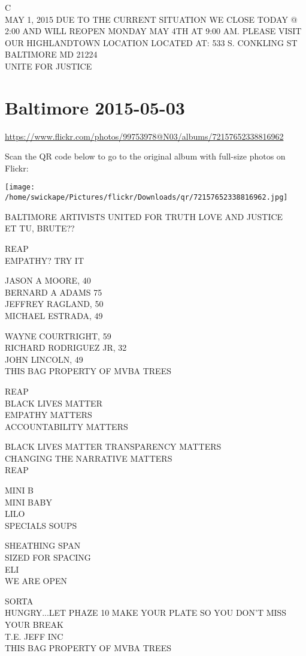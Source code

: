 \documentclass[10pt,letterpaper]{article}
\begin{document}
C\\
MAY 1, 2015  DUE TO THE CURRENT SITUATION WE CLOSE TODAY @ 2:00 AND WILL REOPEN MONDAY MAY 4TH AT 9:00 AM.  PLEASE VISIT OUR HIGHLANDTOWN LOCATION LOCATED AT: 533 S. CONKLING ST BALTIMORE MD 21224\\
UNITE FOR JUSTICE


\section*{Baltimore 2015-05-03}

\url{https://www.flickr.com/photos/99753978@N03/albums/72157652338816962}

Scan the QR code below to go to the original album with full-size photos on Flickr:

\texttt{[image: /home/swickape/Pictures/flickr/Downloads/qr/72157652338816962.jpg]}


BALTIMORE ARTIVISTS UNITED FOR TRUTH LOVE AND JUSTICE\\
ET TU, BRUTE??

REAP\\
EMPATHY?  TRY IT

JASON A MOORE, 40\\
BERNARD A ADAMS 75\\
JEFFREY RAGLAND, 50\\
MICHAEL ESTRADA, 49

WAYNE COURTRIGHT, 59\\
RICHARD RODRIGUEZ JR, 32\\
JOHN LINCOLN, 49\\
THIS BAG PROPERTY OF MVBA TREES

REAP\\
BLACK LIVES MATTER\\
EMPATHY MATTERS\\
ACCOUNTABILITY MATTERS

BLACK LIVES MATTER TRANSPARENCY MATTERS\\
CHANGING THE NARRATIVE MATTERS\\
REAP

MINI B\\
MINI BABY\\
LILO\\
SPECIALS SOUPS

SHEATHING SPAN\\
SIZED FOR SPACING\\
ELI\\
WE ARE OPEN

SORTA\\
HUNGRY...LET PHAZE 10 MAKE YOUR PLATE SO YOU DON'T MISS YOUR BREAK\\
T.E. JEFF INC\\
THIS BAG PROPERTY OF MVBA TREES
\end{document}
